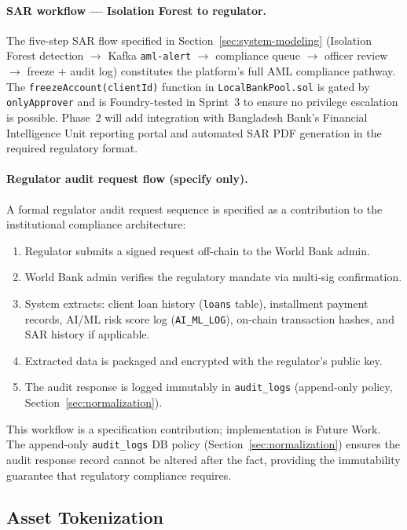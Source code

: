 \documentclass[12pt,a4paper]{report}
\begin{document}
\paragraph{SAR workflow --- Isolation Forest to regulator.}
The five-step SAR flow specified in Section~\ref{sec:system-modeling} (Isolation Forest detection $\to$ Kafka \texttt{aml-alert} $\to$ compliance queue $\to$ officer review $\to$ freeze + audit log) constitutes the platform's full AML compliance pathway. The \texttt{freezeAccount(clientId)} function in \texttt{LocalBankPool.sol} is gated by \texttt{onlyApprover} and is Foundry-tested in Sprint~3 to ensure no privilege escalation is possible. Phase~2 will add integration with Bangladesh Bank's Financial Intelligence Unit reporting portal and automated SAR PDF generation in the required regulatory format.

\paragraph{Regulator audit request flow (specify only).}
A formal regulator audit request sequence is specified as a contribution to the institutional compliance architecture:

\begin{enumerate}[noitemsep]
\item Regulator submits a signed request off-chain to the World Bank admin.
\item World Bank admin verifies the regulatory mandate via multi-sig confirmation.
\item System extracts: client loan history (\texttt{loans} table), installment payment records, AI/ML risk score log (\texttt{AI\_ML\_LOG}), on-chain transaction hashes, and SAR history if applicable.
\item Extracted data is packaged and encrypted with the regulator's public key.
\item The audit response is logged immutably in \texttt{audit\_logs} (append-only policy, Section~\ref{sec:normalization}).
\end{enumerate}

This workflow is a specification contribution; implementation is Future Work. The append-only \texttt{audit\_logs} DB policy (Section~\ref{sec:normalization}) ensures the audit response record cannot be altered after the fact, providing the immutability guarantee that regulatory compliance requires.

\subsection{Asset Tokenization}
\end{document}
